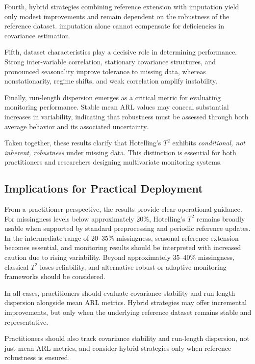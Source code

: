 Fourth, hybrid strategies combining reference extension with imputation yield only modest improvements and remain dependent on the robustness of the reference dataset. imputation alone cannot compensate for deficiencies in covariance estimation.

Fifth, dataset characteristics play a decisive role in determining performance. Strong inter-variable correlation, stationary covariance structures, and pronounced seasonality improve tolerance to missing data, whereas nonstationarity, regime shifts, and weak correlation amplify instability.

Finally, run-length dispersion emerges as a critical metric for evaluating monitoring performance. Stable mean \ac{ARL} values may conceal substantial increases in variability, indicating that robustness must be assessed through both average behavior and its associated uncertainty.

Taken together, these results clarify that Hotelling’s $T^2$ exhibits \textit{conditional, not inherent, robustness} under missing data. This distinction is essential for both practitioners and researchers designing multivariate monitoring systems.

\subsection{Implications for Practical Deployment}

From a practitioner perspective, the results provide clear operational guidance. For missingness levels below approximately 20\%, Hotelling’s $T^2$ remains broadly usable when supported by standard preprocessing and periodic reference updates. In the intermediate range of 20--35\% missingness, seasonal reference extension becomes essential, and monitoring results should be interpreted with increased caution due to rising variability. Beyond approximately 35--40\% missingness, classical $T^2$ loses reliability, and alternative robust or adaptive monitoring frameworks should be considered.

In all cases, practitioners should evaluate covariance stability and run-length dispersion alongside mean \ac{ARL} metrics. Hybrid strategies may offer incremental improvements, but only when the underlying reference dataset remains stable and representative.

Practitioners should also track covariance stability and run-length dispersion, not just mean \ac{ARL} metrics, and consider hybrid strategies only when reference robustness is ensured.

